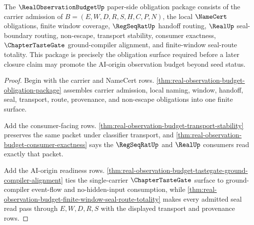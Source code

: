 \begin{theorem}
\label{thm:real-observation-budget-obligation-closure-readiness}
The $\RealObservationBudgetUp$ paper-side obligation package consists of the carrier admission of $B=(E,W,D,R,S,H,C,P,N)$, the local $\NameCert$ obligations, finite window coverage, $\RegSeqRatUp$ handoff routing, $\RealUp$ seal-boundary routing, non-escape, transport stability, consumer exactness, $\ChapterTasteGate$ ground-compiler alignment, and finite-window seal-route totality. This package is precisely the obligation surface required before a later closure claim may promote the AI-origin observation budget beyond seed status.
\end{theorem}
\begin{proof}
Begin with the carrier and NameCert rows. \autoref{thm:real-observation-budget-obligation-package} assembles carrier admission, local naming, window, handoff, seal, transport, route, provenance, and non-escape obligations into one finite surface.

Add the consumer-facing rows. \autoref{thm:real-observation-budget-transport-stability} preserves the same packet under classifier transport, and \autoref{thm:real-observation-budget-consumer-exactness} says the $\RegSeqRatUp$ and $\RealUp$ consumers read exactly that packet.

Add the AI-origin readiness rows. \autoref{thm:real-observation-budget-tastegate-ground-compiler-alignment} ties the single-carrier $\ChapterTasteGate$ surface to ground-compiler event-flow and no-hidden-input consumption, while \autoref{thm:real-observation-budget-finite-window-seal-route-totality} makes every admitted seal read pass through $E,W,D,R,S$ with the displayed transport and provenance rows.
\end{proof}

